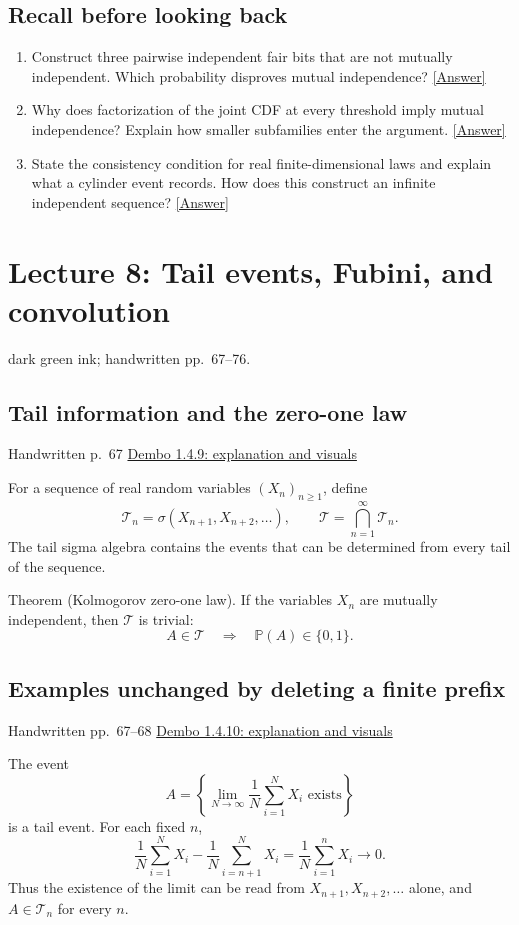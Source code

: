 \documentclass[11pt,letterpaper]{article}
\newcommand{\lecturesection}[1]{\subsection{#1}}
\begin{document}
\subsection*{Recall before looking back}
\begin{enumerate}
\item Construct three pairwise independent fair bits that are not mutually independent. Which probability disproves mutual independence? \hyperlink{answer-l7-s4}{[Answer]}
\item Why does factorization of the joint CDF at every threshold imply mutual independence? Explain how smaller subfamilies enter the argument. \hyperlink{answer-l7-s7}{[Answer]}
\item State the consistency condition for real finite-dimensional laws and explain what a cylinder event records. How does this construct an infinite independent sequence? \hyperlink{answer-l7-s13}{[Answer]}
\end{enumerate}

\clearpage
{}
\section{Lecture 8: Tail events, Fubini, and convolution}
{\small dark green ink; handwritten pp.\ 67--76.}

\hypertarget{l8-s1}{}
\lecturesection{Tail information and the zero-one law}
{\small\textcolor{lectureink}{Handwritten p.\ 67} \quad \href{https://josephrbailey.com/probability/\#entry-1-4-9}{Dembo 1.4.9: explanation and visuals}}

For a sequence of real random variables $(X_n)_{n\ge1}$, define \[\mathcal T_n=\sigma(X_{n+1},X_{n+2},\ldots),\qquad\mathcal T=\bigcap_{n=1}^{\infty}\mathcal T_n.\] The tail sigma algebra contains the events that can be determined from every tail of the sequence.

Theorem (Kolmogorov zero-one law). If the variables $X_n$ are mutually independent, then $\mathcal T$ is trivial: \[A\in\mathcal T\quad\Longrightarrow\quad\mathbb P(A)\in\{0,1\}.\]

\hypertarget{l8-s2}{}
\lecturesection{Examples unchanged by deleting a finite prefix}
{\small\textcolor{lectureink}{Handwritten pp.\ 67--68} \quad \href{https://josephrbailey.com/probability/\#entry-1-4-10}{Dembo 1.4.10: explanation and visuals}}

The event \[A=\left\{\lim_{N\to\infty}\frac1N\sum_{i=1}^N X_i\text{ exists}\right\}\] is a tail event. For each fixed $n$, \[\frac1N\sum_{i=1}^N X_i-\frac1N\sum_{i=n+1}^N X_i=\frac1N\sum_{i=1}^n X_i\longrightarrow0.\] Thus the existence of the limit can be read from $X_{n+1},X_{n+2},\ldots$ alone, and $A\in\mathcal T_n$ for every $n$.
\end{document}
